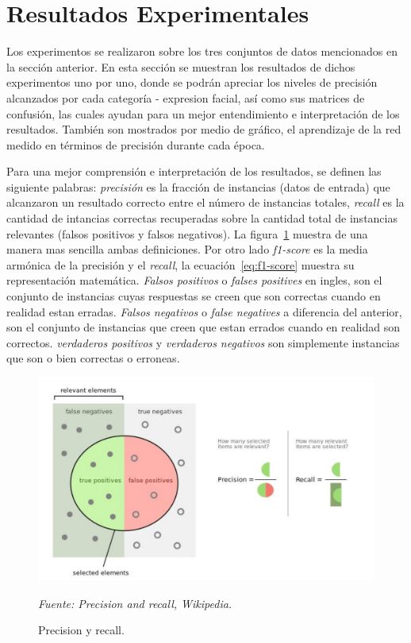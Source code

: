 \section{Resultados Experimentales}
\label{sec:experiment}

Los experimentos se realizaron sobre los tres conjuntos de datos mencionados en la sección anterior. En esta sección se muestran los resultados de dichos experimentos uno por uno, donde se podrán apreciar los niveles de precisión alcanzados por cada categoría - expresion facial, así como sus matrices de confusión, las cuales ayudan para un mejor entendimiento e interpretación de los resultados. También son mostrados por medio de gráfico, el aprendizaje de la red medido en términos de precisión durante cada época.

Para una mejor comprensión e interpretación de los resultados, se definen las siguiente palabras: \textit{precisión} es la fracción de instancias (datos de entrada) que alcanzaron un resultado correcto entre el número de instancias totales, \textit{recall} es la cantidad de intancias correctas recuperadas sobre la cantidad total de instancias relevantes (falsos positivos y falsos negativos). La figura~\ref{fig:precisionRecall} muestra de una manera mas sencilla ambas definiciones. Por otro lado \textit{f1-score} es la media armónica de la precisión y el \textit{recall}, la ecuación~\ref{eq:f1-score} muestra su representación matemática. \textit{Falsos positivos} o \textit{falses positives} en ingles, son el conjunto de instancias cuyas respuestas se creen que son correctas cuando en realidad estan erradas. \textit{Falsos negativos} o \textit{false negatives} a diferencia del anterior, son el conjunto de instancias que creen que estan errados cuando en realidad son correctos. \textit{verdaderos positivos} y \textit{verdaderos negativos} son simplemente instancias que son o bien correctas o erroneas.

\begin{figure}[H]
		\centering
		\includegraphics[width=120mm]{Imagenes/Precisionrecall.pdf}
		\caption{Precision y recall.}
		\vspace{0.15cm}
		\textit{Fuente: Precision and recall, Wikipedia.}
		\label{fig:precisionRecall}
\end{figure}

